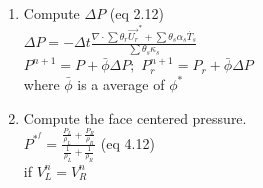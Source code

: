 \documentclass[fleqn]{article}
\newcommand{\delt}          {\ensuremath{\Delta{t}} }
\newcommand{\delx}          {\ensuremath{\Delta{x}} }
\newcommand{\sv}[1]         {\ensuremath{v^o_{r_{#1}} }}
\begin{document}
\begin{enumerate}
  $ \sigma_r = n \cdot [ (\theta_r(\sigma_r - \sigma)] \cdot n$ \\
  $ \bar \sigma_r = n \cdot [ (\theta_r(\sigma_r - \sigma)]^* \cdot n$\\
  $\langle \rho_r \rangle = \frac{\rho_{r_L}\rho_{r_R} }{ \rho_{r_L} + \rho_{r_R}}$ \\
Devatoric: $[\theta_r(\tau_r - \tau)]^* = \langle \rho_r \rangle[\sv{L}(\tau_r - \tau)_L + 
                                                                 \sv{R}(\tau_r - \tau)_R] $
                                                               \hspace{ 0.5 in} (eq 4.13a) (not included) \\
Isotropic: $[\theta_r(P_r - P)]^* I = \langle \rho_r \rangle[\sv{L}(P_r - P)_L +         
                                                             \sv{R}(P_r - P)_R]I
                                         + \overbrace{\langle \rho_r \rangle(\sv{L} + 
                                           \sv{R})\delta P^*_r I}^{\text{not included in vel\_FC calc}} $ \\
 where
  $\langle \rho_r\rangle(\sv{L} + \sv{R})\delta P^*_r = 
        -\langle \rho_R\rangle\phi^*_r c^*_r (\vec{U}_{r_R} - \vec{U}_{r_L})$  \hspace{ 0.5 in} (eq 4.13c)\\ \\
  $
      \vec{U_r}^{*^{f}} 
       = \langle \vec{U}_r \rangle 
       - \langle \sv{} \rangle \frac{\delt^\prime}{\delx} (P_R - P_L) 
       - \langle \sv{} \rangle \frac{\delt^\prime}{\delx}\biggl[ \frac{(\bar{\sigma_r} - \sigma_{r_L})}{\theta_{r_L}} +
                                                  \frac{({\sigma_{r_R}} - \bar\sigma_{r})}{\theta_{r_R}} \biggr]
      + \overbrace{\frac{1}{2}}^{\text{??}}
        \langle \sv{} \rangle \delt(\theta_{s_L}K_L + \theta_{s_R}K_R)(\vec{U}^*_s - \vec{U}^*_r)
 $ (eq. 4.10 a)\\
   This involves a pointwise implicit solve.
\item Compute $\Delta P$ (eq 2.12)\\
$
     \Delta P = -\delt \frac{\nabla \cdot \sum{\theta_r \vec{U_r}^*} + 
                             \sum {\theta_s \alpha_s \dot{T_s}}  }
     {\sum\theta_s \kappa_s} 
$ \\
$P^{n+1} = P + \bar{\phi}\Delta{P};$ \hspace {0.5in}
$P_r^{n+1} = P_r + \bar{\phi}\Delta{P}$ \\
where $\bar{\phi}$ is a average of $\phi^*$
\item Compute the face centered pressure.\\
$
    P^{*^{f}} = \frac{\frac{P_L}{\rho_L} + \frac{ P_R}{\rho_R}}
                     {\frac{1}{\rho_L} + \frac{1}{\rho_R}}
$ \hspace{ 0.5 in} (eq 4.12)\\
if $V^n_L = V^n_R$


\end{enumerate}
\end{document}
